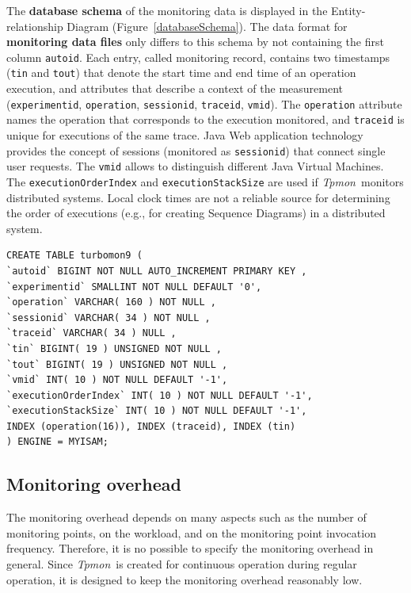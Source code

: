\documentclass[a4paper,12pt]{scrartcl}
\newcommand{\tpmon}{\textit{Tpmon}}
\begin{document}
The \textbf{database schema} of the monitoring data is displayed in the Entity-relationship Diagram (Figure~\ref{databaseSchema}). The data format for \textbf{monitoring data files} only differs to this schema by not containing the first column \texttt{autoid}. Each entry, called monitoring record, contains two timestamps (\texttt{tin} and \texttt{tout}) that denote the start time and end time of an operation execution, and attributes that describe a context of the measurement (\texttt{experimentid}, \texttt{operation}, \texttt{sessionid}, \texttt{traceid}, \texttt{vmid}). The \texttt{operation} attribute names the operation that corresponds to the execution monitored, and \texttt{traceid} is unique for executions of the same trace. %
 Java Web application technology provides the concept of sessions (monitored as \texttt{sessionid}) that connect single user requests. %
The \texttt{vmid} allows to distinguish different Java Virtual Machines. %
The \texttt{executionOrderIndex} and \texttt{executionStackSize} are used if \tpmon\ monitors distributed systems. Local clock times are not a reliable source for determining the order of executions (e.g., for creating Sequence Diagrams) in a distributed system.

\begin{lstlisting}[caption={SQL script for preparing the database table},label={OutputHelloWorld3}]
 CREATE TABLE turbomon9 (
`autoid` BIGINT NOT NULL AUTO_INCREMENT PRIMARY KEY ,
`experimentid` SMALLINT NOT NULL DEFAULT '0',
`operation` VARCHAR( 160 ) NOT NULL ,
`sessionid` VARCHAR( 34 ) NOT NULL ,
`traceid` VARCHAR( 34 ) NULL ,
`tin` BIGINT( 19 ) UNSIGNED NOT NULL ,
`tout` BIGINT( 19 ) UNSIGNED NOT NULL ,
`vmid` INT( 10 ) NOT NULL DEFAULT '-1',
`executionOrderIndex` INT( 10 ) NOT NULL DEFAULT '-1',
`executionStackSize` INT( 10 ) NOT NULL DEFAULT '-1',
INDEX (operation(16)), INDEX (traceid), INDEX (tin)
) ENGINE = MYISAM;
\end{lstlisting}

\subsection{Monitoring overhead}

The monitoring overhead depends on many aspects such as the number of monitoring points, on the workload, and on the monitoring point invocation frequency. Therefore, it is no possible to specify the monitoring overhead in general. Since \tpmon\ is created for continuous operation during regular operation, it is designed to keep the monitoring 
overhead reasonably low. 
\end{document}
